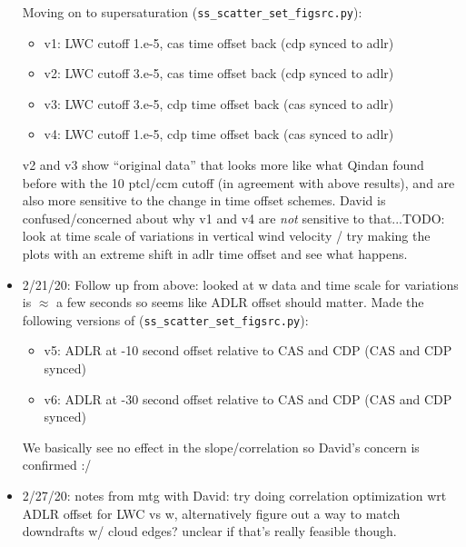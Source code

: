 \documentclass{article}
\begin{document}
\begin{itemize}
	Moving on to supersaturation (\texttt{ss\_scatter\_set\_figsrc.py}):
	\begin{itemize}
		\item v1: LWC cutoff 1.e-5, cas time offset back (cdp synced to adlr)
		\item v2: LWC cutoff 3.e-5, cas time offset back (cdp synced to adlr)
		\item v3: LWC cutoff 3.e-5, cdp time offset back (cas synced to adlr)
		\item v4: LWC cutoff 1.e-5, cdp time offset back (cas synced to adlr)
	\end{itemize}
	v2 and v3 show ``original data'' that looks more like what Qindan found before with the 10 ptcl/ccm cutoff (in agreement with above results), and are also more sensitive to the change in time offset schemes. David is confused/concerned about why v1 and v4 are \emph{not} sensitive to that...TODO: look at time scale of variations in vertical wind velocity / try making the plots with an extreme shift in adlr time offset and see what happens.
	\item 2/21/20: Follow up from above: looked at w data and time scale for variations is $\approx$ a few seconds so seems like ADLR offset should matter. Made the following versions of (\texttt{ss\_scatter\_set\_figsrc.py}):
	\begin{itemize}
		\item v5: ADLR at -10 second offset relative to CAS and CDP (CAS and CDP synced)
		\item v6: ADLR at -30 second offset relative to CAS and CDP (CAS and CDP synced)
	\end{itemize}
	We basically see no effect in the slope/correlation so David's concern is confirmed :/ 
	\item 2/27/20: notes from mtg with David: try doing correlation optimization wrt ADLR offset for LWC vs w, alternatively figure out a way to match downdrafts w/ cloud edges? unclear if that's really feasible though.
\end{itemize}
\end{document}
